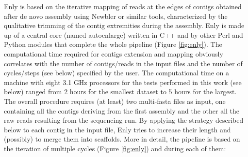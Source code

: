Enly is based on the iterative mapping of reads at the edges of contigs obtained after de novo assembly using Newbler or similar tools, characterized by the qualitative trimming of the contig extremities during the assembly. Enly is made up of a central core (named autoenlarge) written in C++ and by other Perl and Python modules that complete the whole pipeline (Figure \ref{fig:enly}). The computational time required for contigs extension and mapping obviously correlates with the number of contigs/reads in the input files and the number of cycles/steps (see below) specified by the user. The computational time on a machine with eight 3.1 GHz processors for the tests performed in this work (see below) ranged from 2 hours for the smallest dataset to 5 hours for the largest.
The overall procedure requires (at least) two multi-fasta files as input, one containing all the contigs deriving from the first assembly and the other all the raw reads resulting from the sequencing run. By applying the strategy described below to each contig in the input file, Enly tries to increase their length and (possibly) to merge them into scaffolds.
More in detail, the pipeline is based on the iteration of multiple cycles (Figure \ref{fig:enly}) and during each of them:
